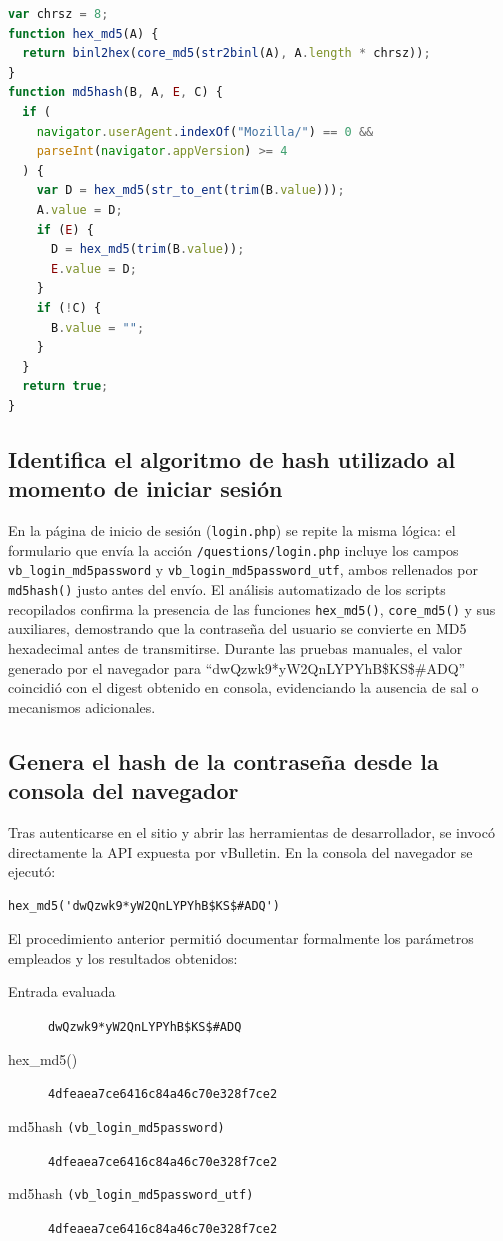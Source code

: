 \documentclass[letter,12pt]{article}
\begin{document}
\begin{lstlisting}[language=javascript,basicstyle=\ttfamily\small,keywordstyle=\color{blue},stringstyle=\color{red}]
var chrsz = 8;
function hex_md5(A) {
  return binl2hex(core_md5(str2binl(A), A.length * chrsz));
}
function md5hash(B, A, E, C) {
  if (
    navigator.userAgent.indexOf("Mozilla/") == 0 &&
    parseInt(navigator.appVersion) >= 4
  ) {
    var D = hex_md5(str_to_ent(trim(B.value)));
    A.value = D;
    if (E) {
      D = hex_md5(trim(B.value));
      E.value = D;
    }
    if (!C) {
      B.value = "";
    }
  }
  return true;
}
\end{lstlisting}

\subsection{Identifica el algoritmo de hash utilizado al momento de iniciar sesión}

En la página de inicio de sesión (\texttt{login.php}) se repite la misma lógica: el formulario que envía la acción \texttt{/questions/login.php} incluye los campos \texttt{vb\_login\_md5password} y \texttt{vb\_login\_md5password\_utf}, ambos rellenados por \texttt{md5hash()} justo antes del envío. El análisis automatizado de los scripts recopilados confirma la presencia de las funciones \texttt{hex\_md5()}, \texttt{core\_md5()} y sus auxiliares, demostrando que la contraseña del usuario se convierte en MD5 hexadecimal antes de transmitirse. Durante las pruebas manuales, el valor generado por el navegador para ``dwQzwk9*yW2QnLYPYhB\$KS\$\#ADQ'' coincidió con el digest obtenido en consola, evidenciando la ausencia de sal o mecanismos adicionales.

\subsection{Genera el hash de la contraseña desde la consola del navegador}

Tras autenticarse en el sitio y abrir las herramientas de desarrollador, se invocó directamente la API expuesta por vBulletin. En la consola del navegador se ejecutó:

\begin{verbatim}
hex_md5('dwQzwk9*yW2QnLYPYhB$KS$#ADQ')
\end{verbatim}

El procedimiento anterior permitió documentar formalmente los parámetros empleados y los resultados obtenidos:

\begin{description}
  \item[Entrada evaluada] \texttt{dwQzwk9*yW2QnLYPYhB\$KS\$\#ADQ}
  \item[hex\_md5()] \texttt{4dfeaea7ce6416c84a46c70e328f7ce2}
  \item[md5hash \texttt{(vb\_login\_md5password)}] \texttt{4dfeaea7ce6416c84a46c70e328f7ce2}
  \item[md5hash \texttt{(vb\_login\_md5password\_utf)}] \texttt{4dfeaea7ce6416c84a46c70e328f7ce2}
\end{description}
\end{document}
